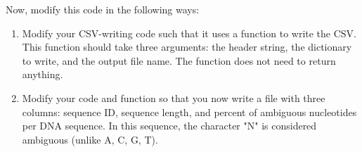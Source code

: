 \documentclass{article}[12pt]
\begin{document}
\begin{enumerate}[itemsep=5ex]
	Now, modify this code in the following ways:
		\begin{enumerate}[itemsep=2ex]
	
			\item Modify your CSV-writing code such that it uses a function to write the CSV. This function should take three arguments: the header string, the dictionary to write, and the output file name. The function does not need to return anything.
		
			\item Modify your code and function so that you now write a file with three columns: sequence ID, sequence length, and percent of ambiguous nucleotides per DNA sequence. In this sequence, the character "N" is considered ambiguous (unlike A, C, G, T).
			
		\end{enumerate}
	\end{enumerate}	










\end{document}
